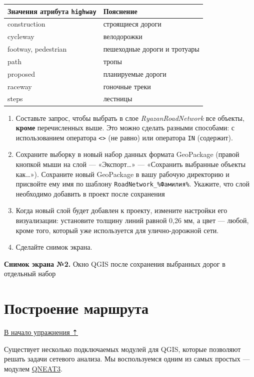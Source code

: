 \documentclass[
  12pt,
]{book}
\begin{document}
\begin{longtable}[]{@{}ll@{}}
\toprule()
Значения атрибута \texttt{highway} & Пояснение \\
\midrule()
\endhead
construction & строящиеся дороги \\
cycleway & велодорожки \\
footway, pedestrian & пешеходные дороги и тротуары \\
path & тропы \\
proposed & планируемые дороги \\
raceway & гоночные треки \\
steps & лестницы \\
\bottomrule()
\end{longtable}

\begin{enumerate}
\def\labelenumi{\arabic{enumi}.}
\item
  Составьте запрос, чтобы выбрать в слое \emph{RyazanRoadNetwork} все объекты, \textbf{кроме} перечисленных выше. Это можно сделать разными способами: с использованием оператора \texttt{\textless{}\textgreater{}} (не равно) или оператора \texttt{IN} (содержит).
\item
  Сохраните выборку в новый набор данных формата GeoPackage (правой кнопкой мыши на слой --- «Экспорт\ldots» --- «Сохранить выбранные объекты как\ldots»). Сохраните новый GeoPackage в вашу рабочую директорию и присвойте ему имя по шаблону \texttt{RoadNetwork\_\%Фамилия\%}. Укажите, что слой необходимо добавить в проект после сохранения
\item
  Когда новый слой будет добавлен к проекту, измените настройки его визуализации: установите толщину линий равной 0,26 мм, а цвет --- любой, кроме того, который уже используется для улично-дорожной сети.
\item
  Сделайте снимок экрана.
\end{enumerate}

\textbf{Снимок экрана №2.} Окно QGIS после сохранения выбранных дорог в отдельный набор

\hypertarget{networks-route}{%
\section{Построение маршрута}\label{networks-route}}

\protect\hyperlink{networks}{В начало упражнения ⇡}

Существует несколько подключаемых модулей для QGIS, которые позволяют решать задачи сетевого анализа. Мы воспользуемся одним из самых простых --- модулем \href{https://root676.github.io/}{QNEAT3}.
\end{document}
